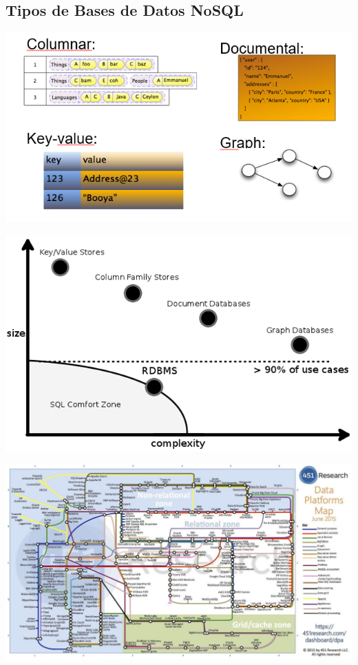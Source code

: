 \documentclass[
]{book}
\begin{document}
\hypertarget{tipos-de-bases-de-datos-nosql}{%
\subsection{Tipos de Bases de Datos NoSQL}\label{tipos-de-bases-de-datos-nosql}}

\includegraphics{images/TiposBBDDNoSQL.png}

\includegraphics{images/TiposBBDDNoSQL2.png}

\includegraphics{images/451ResearchMap.png}
\end{document}

